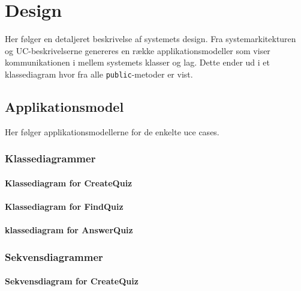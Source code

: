 \chapter{Design}
Her følger en detaljeret beskrivelse af systemets design. Fra systemarkitekturen og UC-beskrivelserne genereres en række applikationsmodeller som viser kommunikationen i mellem systemets klasser og lag. Dette ender ud i et klassediagram hvor fra alle \verb+public+-metoder er vist.

\section{Applikationsmodel}
Her følger applikationsmodellerne for de enkelte uce cases.

\subsection{Klassediagrammer}

\subsubsection{Klassediagram for CreateQuiz}


\subsubsection{Klassediagram for FindQuiz}



\subsubsection{klassediagram for AnswerQuiz}


\subsection{Sekvensdiagrammer}

\subsubsection{Sekvensdiagram for CreateQuiz}


